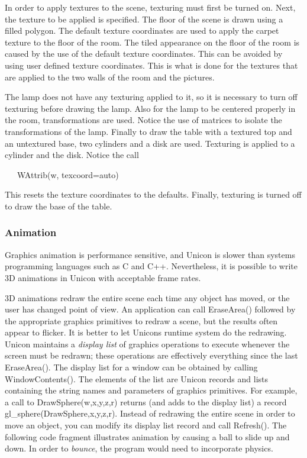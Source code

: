 In order to apply textures to the scene, texturing must first be turned
on. Next, the texture to be applied is specified. The floor of the
scene is drawn using a filled polygon. The default texture coordinates
are used to apply the carpet texture to the floor of the room. The
tiled appearance on the floor of the room is caused by the use of the
default texture coordinates. This can be avoided by using user
defined texture coordinates. This is what is done for the textures that
are applied to the two walls of the room and the pictures. 

The lamp does not have any texturing applied to it, so it is necessary
to turn off texturing before drawing the lamp. Also for the lamp to be
centered properly in the room, transformations are used. Notice the use
of matrices to isolate the transformations of the lamp. Finally to draw
the table with a textured top and an untextured base, two cylinders and
a disk are used. Texturing is applied to a cylinder and the disk.
Notice the call 

\ \ \ WAttrib(w, {\textquotedbl}texcoord=auto{\textquotedbl})

This resets the texture coordinates to the defaults. Finally, texturing
is turned off to draw the base of the table.

\subsubsection{Animation}

Graphics animation is performance sensitive, and Unicon is slower than
systems programming languages such as C and C++. Nevertheless, it is
possible to write 3D animations in Unicon with acceptable frame rates.

3D animations redraw the entire scene each time any object has moved, or
the user has changed point of view. An application can call EraseArea()
followed by the appropriate graphics primitives to redraw a scene, but
the results often appear to flicker. It is better to let
Unicon{\textquotesingle}s runtime system do the redrawing. Unicon
maintains a \textit{display list} of graphics operations to execute
whenever the screen must be redrawn; these operations are effectively
everything since the last EraseArea(). The display list for a window
can be obtained by calling WindowContents(). The elements of the list
are Unicon records and lists containing the string names and parameters
of graphics primitives. For example, a call to DrawSphere(w,x,y,z,r)
returns (and adds to the display list) a record
gl\_sphere({\textquotedbl}DrawSphere{\textquotedbl},x,y,z,r). Instead
of redrawing the entire scene in order to move an object, you can
modify its display list record and call Refresh(). The following code
fragment illustrates animation by causing a ball to slide up and down.
In order to \textit{bounce}, the program would need to incorporate
physics. 

